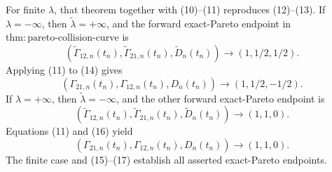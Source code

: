 For finite \(\lambda\), that theorem together with (10)--(11) reproduces (12)--(13).  If \(\lambda=-\infty\), then \(\widetilde\lambda=+\infty\), and the forward exact-Pareto endpoint in \(\mathrm{thm{:}pareto\text{-}collision\text{-}curve}\) is
\[
(\widetilde\Gamma_{12,n}(t_n),
  \widetilde\Gamma_{21,n}(t_n),
  \widetilde D_n(t_n))
\longrightarrow(1,1/2,1/2).
\tag{14}
\]
Applying (11) to (14) gives
\[
(\Gamma_{21,n}(t_n),\Gamma_{12,n}(t_n),D_n(t_n))
\longrightarrow(1,1/2,-1/2).
\tag{15}
\]
If \(\lambda=+\infty\), then \(\widetilde\lambda=-\infty\), and the other forward exact-Pareto endpoint is
\[
(\widetilde\Gamma_{12,n}(t_n),
  \widetilde\Gamma_{21,n}(t_n),
  \widetilde D_n(t_n))
\longrightarrow(1,1,0).
\tag{16}
\]
Equations (11) and (16) yield
\[
(\Gamma_{21,n}(t_n),\Gamma_{12,n}(t_n),D_n(t_n))
\longrightarrow(1,1,0).
\tag{17}
\]
The finite case and (15)--(17) establish all asserted exact-Pareto endpoints.